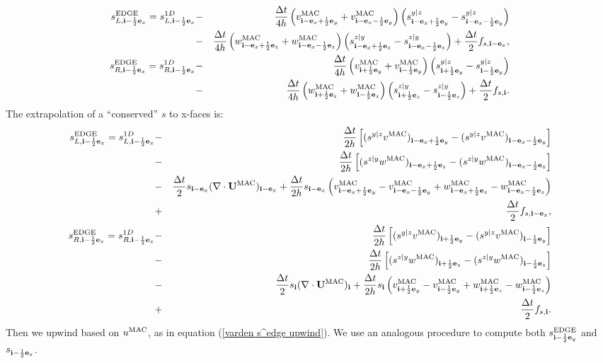 \documentclass[11pt]{article}
\def\half  {\frac{1}{2}}
\def\dt    {\Delta t}
\def\edge  {\rm EDGE}
\def\mac   {\rm MAC}
\def\eb    {{\bf e}}
\def\ib    {{\bf i}}
\def\Ub    {{\bf U}}
\begin{document}
\begin{eqnarray}
s_{L,\ib-\half\eb_x}^{\edge} = s_{L,\ib-\half\eb_x}^{1D} &-& \frac{\dt}{4h}\left(v_{\ib-\eb_x+\half\eb_y}^{\mac}+v_{\ib-\eb_x-\half\eb_y}^{\mac}\right)\left(s_{\ib-\eb_x+\half\eb_y}^{y|z}-s_{\ib-\eb_x-\half\eb_y}^{y|z}\right) \nonumber \\
&-& \frac{\dt}{4h}\left(w_{\ib-\eb_x+\half\eb_z}^{\mac}+w_{\ib-\eb_x-\half\eb_z}^{\mac}\right)\left(s_{\ib-\eb_x+\half\eb_z}^{z|y}-s_{\ib-\eb_x-\half\eb_z}^{z|y}\right) + \frac{\dt}{2}f_{s,\ib-\eb_x}, \\
s_{R,\ib-\half\eb_x}^{\edge} = s_{R,\ib-\half\eb_x}^{1D} &-& \frac{\dt}{4h}\left(v_{\ib+\half\eb_y}^{\mac}+v_{\ib-\half\eb_y}^{\mac}\right)\left(s_{\ib+\half\eb_y}^{y|z}-s_{\ib-\half\eb_y}^{y|z}\right) \nonumber \\
&-& \frac{\dt}{4h}\left(w_{\ib+\half\eb_z}^{\mac}+w_{\ib-\half\eb_z}^{\mac}\right)\left(s_{\ib+\half\eb_z}^{z|y}-s_{\ib-\half\eb_z}^{z|y}\right) + \frac{\dt}{2}f_{s,\ib}.
\end{eqnarray}
The extrapolation of a ``conserved'' $s$ to x-faces is:
\begin{eqnarray}
s_{L,\ib-\half\eb_x}^{\edge} = s_{L,\ib-\half\eb_x}^{1D} &-& \frac{\dt}{2h}\left[(s^{y|z}v^{\mac})_{\ib-\eb_x+\half\eb_y}-({s^{y|z}v^{\mac})_{\ib-\eb_x-\half\eb_y}}\right] \nonumber \\
&-& \frac{\dt}{2h}\left[(s^{z|y}w^{\mac})_{\ib-\eb_x+\half\eb_z}-({s^{z|y}w^{\mac})_{\ib-\eb_x-\half\eb_z}}\right] \nonumber \\
&-& \frac{\dt}{2}s_{\ib-\eb_x}(\nabla\cdot\Ub^{\mac})_{\ib-\eb_x} + \frac{\dt}{2h}s_{\ib-\eb_x}\left(v_{\ib-\eb_x+\half\eb_y}^{\mac}-v_{\ib-\eb_x-\half\eb_y}^{\mac}+w_{\ib-\eb_x+\half\eb_z}^{\mac}-w_{\ib-\eb_x-\half\eb_z}^{\mac}\right) \nonumber \\
&+& \frac{\dt}{2}f_{s,\ib-\eb_x}, \\
s_{R,\ib-\half\eb_x}^{\edge} = s_{R,\ib-\half\eb_x}^{1D} &-& \frac{\dt}{2h}\left[(s^{y|z}v^{\mac})_{\ib+\half\eb_y}-({s^{y|z}v^{\mac})_{\ib-\half\eb_y}}\right] \nonumber \\
&-& \frac{\dt}{2h}\left[(s^{z|y}w^{\mac})_{\ib+\half\eb_z}-({s^{z|y}w^{\mac})_{\ib-\half\eb_z}}\right] \nonumber \\
&-& \frac{\dt}{2}s_{\ib}(\nabla\cdot\Ub^{\mac})_{\ib} + \frac{\dt}{2h}s_{\ib}\left(v_{\ib+\half\eb_y}^{\mac}-v_{\ib-\half\eb_y}^{\mac}+w_{\ib+\half\eb_z}^{\mac}-w_{\ib-\half\eb_z}^{\mac}\right) \nonumber \\
&+& \frac{\dt}{2}f_{s,\ib}.
\end{eqnarray}
Then we upwind based on $u^{\mac}$, as in equation (\ref{varden s^edge upwind}).  We use an analogous procedure to compute both $s_{\ib-\half\eb_y}^{\edge}$ and $s_{\ib-\half\eb_z}$.
\end{document}
